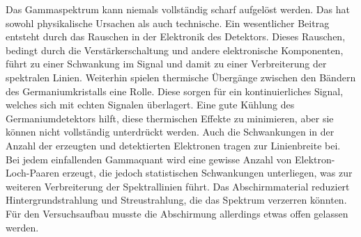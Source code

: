 \noindent Das Gammaspektrum kann niemals vollständig scharf aufgelöst werden. Das hat sowohl physikalische Ursachen als auch technische.
Ein wesentlicher Beitrag entsteht durch das Rauschen in der Elektronik des Detektors. Dieses Rauschen, bedingt durch die Verstärkerschaltung und andere elektronische Komponenten, 
führt zu einer Schwankung im Signal und damit zu einer Verbreiterung der spektralen Linien.
Weiterhin spielen thermische Übergänge zwischen den Bändern des Germaniumkristalls eine Rolle. Diese sorgen für ein kontinuierliches Signal, welches sich mit echten 
Signalen überlagert.
Eine gute Kühlung des Germaniumdetektors hilft, 
diese thermischen Effekte zu minimieren, aber sie können nicht vollständig unterdrückt werden.
Auch die Schwankungen in der Anzahl der erzeugten und detektierten Elektronen tragen zur Linienbreite bei. 
Bei jedem einfallenden Gammaquant wird eine gewisse Anzahl von Elektron-Loch-Paaren erzeugt, die jedoch statistischen Schwankungen unterliegen, was zur weiteren Verbreiterung der Spektrallinien führt.
Das Abschirmmaterial reduziert Hintergrundstrahlung und Streustrahlung, die das Spektrum verzerren könnten. Für den Versuchsaufbau musste die Abschirmung allerdings etwas offen gelassen werden.





